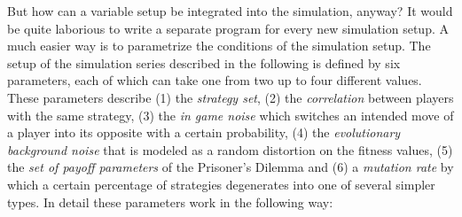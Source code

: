 But how can a variable setup be integrated into the simulation, anyway?  It
would be quite laborious to write a separate program for every new simulation
setup. A much easier way is to parametrize the conditions of the simulation
setup. The setup of the simulation series described in the following is
defined by six parameters, each of which can take one from two up to four
different values. These parameters describe (1) the {\em strategy set}, (2)
the {\em correlation} between players with the same strategy, (3) the {\em in
  game noise} which switches an intended move of a player into its opposite
with a certain probability, (4) the {\em evolutionary background noise} that
is modeled as a random distortion on the fitness values, (5) the {\em set of
  payoff parameters} of the Prisoner's Dilemma and (6) a {\em mutation rate}
by which a certain percentage of strategies degenerates into one of several
simpler types. In detail these parameters work in the following way:


